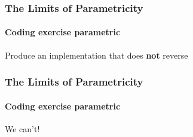 \begin{frame}[fragile]
\frametitle{The Limits of Parametricity}
\framesubtitle{Coding exercise \textemdash parametric}
\begin{block}{Produce an implementation that does \textbf{not} reverse}

\end{block}
\end{frame}

\begin{frame}[fragile]
\frametitle{The Limits of Parametricity}
\framesubtitle{Coding exercise \textemdash parametric}
\begin{center}
We can't!
\end{center}
\end{frame}